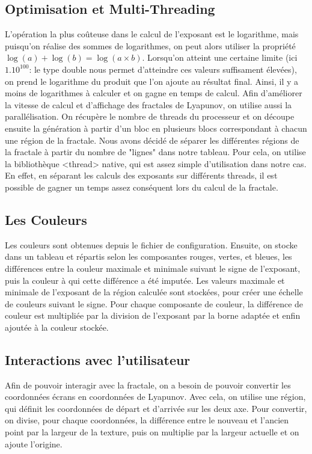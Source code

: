 \documentclass{article}
\begin{document}
	\subsection{Optimisation et Multi-Threading}

	L'opération la plus coûteuse dans le calcul de l'exposant est le logarithme, mais puisqu'on réalise des sommes de logarithmes, on peut alors utiliser la propriété $\log(a) + \log(b) = \log(a \times b)$.
	Lorsqu'on atteint une certaine limite (ici $1.10^{100}$: le type double nous permet d'atteindre ces valeurs suffisament élevées), on prend le logarithme du produit que l'on ajoute au résultat final.
	Ainsi, il y a moins de logarithmes à calculer et on gagne en temps de calcul.
	Afin d'améliorer la vitesse de calcul et d'affichage des fractales de Lyapunov, on utilise aussi la parallélisation.
	On récupère le nombre de threads du processeur et on découpe ensuite la génération à partir d'un bloc en plusieurs blocs correspondant à chacun une région de la fractale.
	Nous avons décidé de séparer les différentes régions de la fractale à partir du nombre de "lignes" dans notre tableau.
	Pour cela, on utilise la bibliothèque <thread> native, qui est assez simple d'utilisation dans notre cas.
	En effet, en séparant les calculs des exposants sur différents threads, il est possible de gagner un temps assez conséquent lors du calcul de la fractale.

	\subsection{Les Couleurs}

	Les couleurs sont obtenues depuis le fichier de configuration.
	Ensuite, on stocke dans un tableau et répartis selon les composantes rouges, vertes, et bleues, les différences entre la couleur maximale et minimale suivant le signe de l'exposant, puis la couleur à qui cette différence a été imputée.
	Les valeurs maximale et minimale de l'exposant de la région calculée sont stockées, pour créer une échelle de couleurs suivant le signe.
	Pour chaque composante de couleur, la différence de couleur est multipliée par la division de l'exposant par la borne adaptée et enfin ajoutée à la couleur stockée.

	\subsection{Interactions avec l'utilisateur}

	Afin de pouvoir interagir avec la fractale, on a besoin de pouvoir convertir les coordonnées écrans en coordonnées de Lyapunov.
	Avec cela, on utilise une région, qui définit les coordonnées de départ et d'arrivée sur les deux axe.
	Pour convertir, on divise, pour chaque coordonnées, la différence entre le nouveau et l'ancien point par la largeur de la texture, puis on multiplie par la largeur actuelle et on ajoute l'origine.
\end{document}
